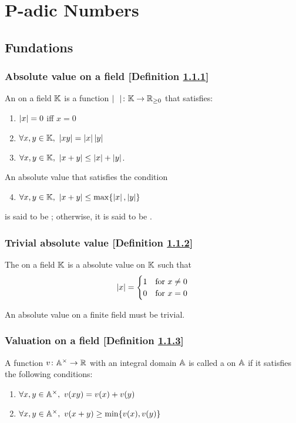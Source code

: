 \section{P-adic Numbers\cite{gouvea}}
\subsection{Fundations}
\subsubsection{Absolute value on a field [Definition \ref{absolute-value-on-a-field}]}\label{absolute-value-on-a-field}
An  on a field $\mathbb{K}$ is a function $\mid \ \ \mid \colon \mathbb{K} \to \mathbb{R}_{\ge0}$ that satisfies:
\begin{enumerate}
\item $\left| x \right| = 0$ iff $x = 0$
\item $\forall x, y \in \mathbb{K},\ \left| xy \right| = \left| x \right|\left| y \right|$
\item $\forall x, y \in \mathbb{K},\ \left| x+y \right| \le \left| x \right|+\left| y \right|$.
\end{enumerate}

An absolute value that satisfies the condition
\begin{enumerate}
\setcounter{enumi}{3}
\item $\forall x, y \in \mathbb{K},\ \left| x+y \right| \le \max \{ \left| x \right|,\left| y \right| \}$
\end{enumerate}
is said to be ; otherwise, it is said to be .

\subsubsection{Trivial absolute value [Definition \ref{trivial-absolute-value}]}\label{trivial-absolute-value}
The  on a field $\mathbb{K}$ is a absolute value on $\mathbb{K}$ such that
\[
\left| x \right| = \begin{cases}
 1 & \text{for}\ x \neq 0 \\
 0 & \text{for}\ x = 0
 \end{cases}
\]

An absolute value on a finite field must be trivial.

\subsubsection{Valuation on a field [Definition \ref{valuation-on-a-field}]}\label{valuation-on-a-field}
A function $v \colon \mathbb{A}^\times \to \mathbb{R}$ with an integral domain $\mathbb{A}$ is called a  on $\mathbb{A}$ if it satisfies the following conditions:
\begin{enumerate}
\item $\forall x, y \in \mathbb{A}^\times,\ v(xy) = v(x) + v(y)$
\item $\forall x, y \in \bb{A}^\times,\ v(x+y) \ge \min \{ v(x), v(y) \}$
\end{enumerate}

